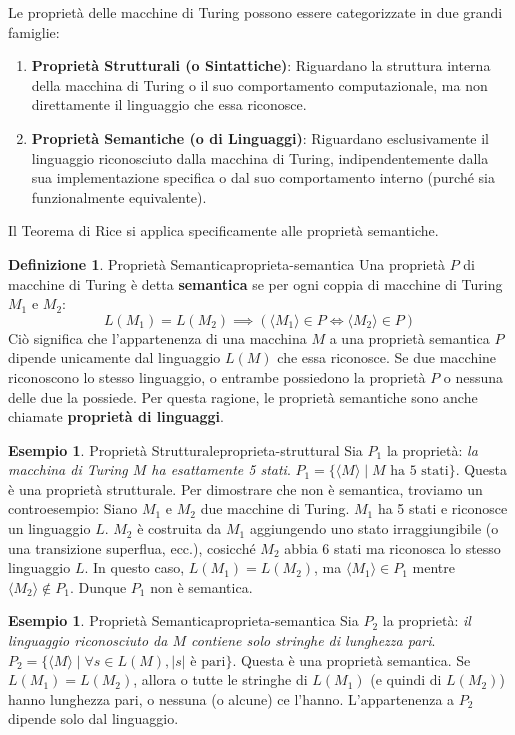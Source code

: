 \documentclass[a4paper]{article}
\theoremstyle{definition} %
\newtheorem{definition}[theorem]{Definizione}
\newtheorem{example}[theorem]{Esempio}
\begin{document}
Le proprietà delle macchine di Turing possono essere categorizzate in due grandi famiglie:
\begin{enumerate}
    \item \textbf{Proprietà Strutturali (o Sintattiche)}: Riguardano la struttura interna della macchina di Turing o il suo comportamento computazionale, ma non direttamente il linguaggio che essa riconosce.
    \item \textbf{Proprietà Semantiche (o di Linguaggi)}: Riguardano esclusivamente il linguaggio riconosciuto dalla macchina di Turing, indipendentemente dalla sua implementazione specifica o dal suo comportamento interno (purché sia funzionalmente equivalente).
\end{enumerate}

Il Teorema di Rice si applica specificamente alle proprietà semantiche.

\begin{definition}{Proprietà Semantica}{proprieta-semantica}
Una proprietà $P$ di macchine di Turing è detta \textbf{semantica} se per ogni coppia di macchine di Turing $M_1$ e $M_2$:
\[ L(M_1) = L(M_2) \implies (\langle M_1 \rangle \in P \iff \langle M_2 \rangle \in P) \]
Ciò significa che l'appartenenza di una macchina $M$ a una proprietà semantica $P$ dipende unicamente dal linguaggio $L(M)$ che essa riconosce. Se due macchine riconoscono lo stesso linguaggio, o entrambe possiedono la proprietà $P$ o nessuna delle due la possiede. Per questa ragione, le proprietà semantiche sono anche chiamate \textbf{proprietà di linguaggi}.
\end{definition}

\begin{example}{Proprietà Strutturale}{proprieta-struttural}
Sia $P_1$ la proprietà: \textit{la macchina di Turing $M$ ha esattamente 5 stati}.
$P_1 = \{ \langle M \rangle \mid M \text{ ha 5 stati} \}$.
Questa è una proprietà strutturale. Per dimostrare che non è semantica, troviamo un controesempio:
Siano $M_1$ e $M_2$ due macchine di Turing. $M_1$ ha 5 stati e riconosce un linguaggio $L$. $M_2$ è costruita da $M_1$ aggiungendo uno stato irraggiungibile (o una transizione superflua, ecc.), cosicché $M_2$ abbia 6 stati ma riconosca lo stesso linguaggio $L$. In questo caso, $L(M_1) = L(M_2)$, ma $\langle M_1 \rangle \in P_1$ mentre $\langle M_2 \rangle \notin P_1$. Dunque $P_1$ non è semantica.
\end{example}

\begin{example}{Proprietà Semantica}{proprieta-semantica}
Sia $P_2$ la proprietà: \textit{il linguaggio riconosciuto da $M$ contiene solo stringhe di lunghezza pari}.
$P_2 = \{ \langle M \rangle \mid \forall s \in L(M), |s| \text{ è pari} \}$.
Questa è una proprietà semantica. Se $L(M_1) = L(M_2)$, allora o tutte le stringhe di $L(M_1)$ (e quindi di $L(M_2)$) hanno lunghezza pari, o nessuna (o alcune) ce l'hanno. L'appartenenza a $P_2$ dipende solo dal linguaggio.
\end{example}
\end{document}
